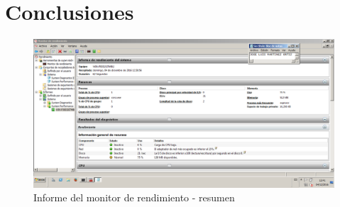 \section{Conclusiones} %

\begin{figure}[H] %
\centering
\includegraphics[scale=0.4]{./imagenes/P3_4_1.png} 
\caption{Informe del monitor de rendimiento - resumen} \label{fig:P3_4_1}
\end{figure}











